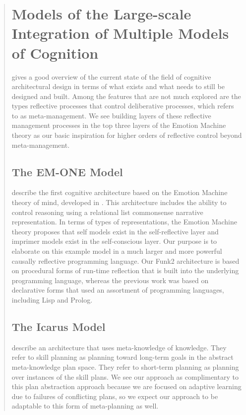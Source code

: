 \begin{quotation}
\section{Models of the Large-scale Integration of Multiple Models of Cognition}

\cite{langley2008car} gives a good overview of the current state of the field of cognitive architectural design in terms of what exists and what needs to still be designed and built.
Among the features that are not much explored are the types reflective processes that control deliberative processes, which \cite{sloman2001vaa} refers to as meta-management.
We see building layers of these reflective management processes in the top three layers of the Emotion Machine theory as our basic inspiration for higher orders of reflective control beyond meta-management.

\subsection{The EM-ONE Model}

\cite{singh2005one} describe the first cognitive architecture based on the Emotion Machine theory of mind, developed in \cite{minsky2006em}.
This architecture includes the ability to control reasoning using a relational list commonsense narrative representation.
In terms of types of representations, the Emotion Machine theory proposes that self models exist in the self-reflective layer and imprimer models exist in the self-conscious layer.
Our purpose is to elaborate on this example model in a much larger and more powerful causally reflective programming language.
Our Funk2 architecture is based on procedural forms of run-time reflection that is built into the underlying programming language, whereas the previous work was based on declarative forms that used an assortment of programming languages, including Lisp and Prolog.

\subsection{The Icarus Model}

\cite{langley2005aap} describe an architecture that uses meta-knowledge of knowledge.
They refer to skill planning as planning toward long-term goals in the abstract meta-knowledge plan space.
They refer to short-term planning as planning over instances of the skill plans.
We see our approach as complimentary to this plan abstraction approach because we are focused on adaptive learning due to failures of conflicting plans, so we expect our approach to be adaptable to this form of meta-planning as well.


\end{quotation}

